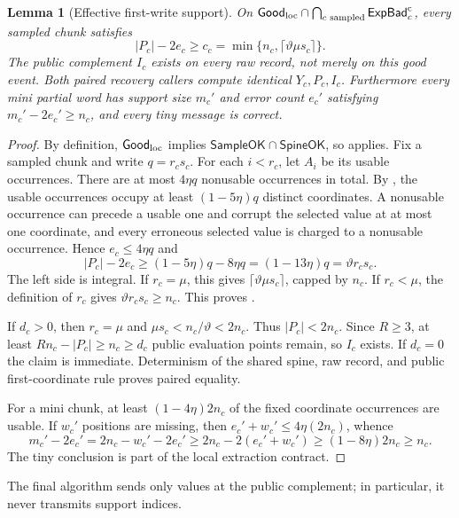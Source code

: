 \documentclass[11pt]{article}
\newtheorem{lemma}{Lemma}[section]
\begin{document}
\begin{lemma}[Effective first-write support]
\label{lem:effective-support}
On
$\mathsf{Good}_{\rm loc}\cap
 \bigcap_{c\text{ sampled}}\mathsf{ExpBad}_c^{\mathrm c}$,
every sampled chunk satisfies
\[
 |P_c|-2e_c\ge
 c_c=\min\{n_c,\lceil\vartheta\mu s_c\rceil\}.
\tag{25}\label{eq:effective-support}
\]
The public complement $I_c$ exists on every raw record, not merely on this good
event.  Both paired recovery callers compute identical $Y_c,P_c,I_c$.
Furthermore every mini partial word has support size $m_c'$ and error count
$e_c'$ satisfying $m_c'-2e_c'\ge n_c$, and every tiny message is correct.
\end{lemma}

\begin{proof}
By definition, $\mathsf{Good}_{\rm loc}$ implies
$\mathsf{SampleOK}\cap\mathsf{SpineOK}$, so  applies.
Fix a sampled chunk and write $q=r_cs_c$.  For each $i<r_c$, let $A_i$ be its
usable occurrences.  There are at most $4\eta q$ nonusable occurrences in
total.  By , the usable occurrences occupy at
least $(1-5\eta)q$ distinct coordinates.  A nonusable occurrence can precede a
usable one and corrupt the selected value at at most one coordinate, and every
erroneous selected value is charged to a nonusable occurrence.  Hence
$e_c\le4\eta q$ and
\[
 |P_c|-2e_c\ge(1-5\eta)q-8\eta q
 =(1-13\eta)q=\vartheta r_cs_c.
\]
The left side is integral.  If $r_c=\mu$, this gives
$\lceil\vartheta\mu s_c\rceil$, capped by $n_c$.  If $r_c<\mu$, the definition
of $r_c$ gives $\vartheta r_cs_c\ge n_c$.  This proves
.

If $d_c>0$, then $r_c=\mu$ and
$\mu s_c<n_c/\vartheta<2n_c$.  Thus $|P_c|<2n_c$.  Since $R\ge3$, at least
$Rn_c-|P_c|\ge n_c\ge d_c$ public evaluation points remain, so $I_c$ exists.
If $d_c=0$ the claim is immediate.  Determinism of the shared spine, raw
record, and public first-coordinate rule proves paired equality.

For a mini chunk, at least $(1-4\eta)2n_c$ of the fixed coordinate occurrences
are usable.  If $w_c'$ positions are missing, then
$e_c'+w_c'\le4\eta(2n_c)$, whence
\[
 m_c'-2e_c'=2n_c-w_c'-2e_c'
 \ge2n_c-2(e_c'+w_c')
 \ge(1-8\eta)2n_c\ge n_c.
\]
The tiny conclusion is part of the local extraction contract.
\end{proof}

The final algorithm sends only values at the public complement; in particular,
it never transmits support indices.
\end{document}
